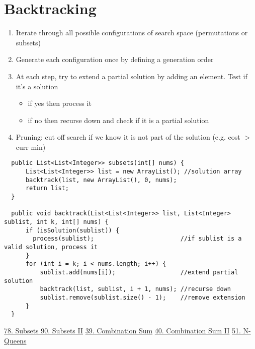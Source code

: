 \documentclass{article}
\begin{document}
  \section{Backtracking}
  \begin{enumerate}[noitemsep]
    \item Iterate through all possible configurations of search space (permutations or subsets)
    \item Generate each configuration once by defining a generation order
    \item At each step, try to extend a partial solution by adding an element. Test if it's a solution
      \begin{itemize}[noitemsep]
        \item if yes then process it
        \item if no then recurse down and check if it is a partial solution
      \end{itemize}
    \item Pruning: cut off search if we know it is not part of the solution (e.g. cost $>$ curr min)
  \end{enumerate}
  \begin{lstlisting}
  public List<List<Integer>> subsets(int[] nums) {
      List<List<Integer>> list = new ArrayList(); //solution array
      backtrack(list, new ArrayList(), 0, nums);
      return list;
  }
  
  public void backtrack(List<List<Integer>> list, List<Integer> sublist, int k, int[] nums) {
      if (isSolution(sublist)) {
        process(sublist);                        //if sublist is a valid solution, process it
      }
      for (int i = k; i < nums.length; i++) {
          sublist.add(nums[i]);                  //extend partial solution
          backtrack(list, sublist, i + 1, nums); //recurse down
          sublist.remove(sublist.size() - 1);    //remove extension
      }
  }
  \end{lstlisting}
  \href{https://leetcode.com/problems/subsets/description/}{78. Subsets
} \quad \href{https://leetcode.com/problems/subsets-ii/description/}{90. Subsets II} \quad \href{https://leetcode.com/problems/combination-sum/description/}{39. Combination Sum} \quad \href{https://leetcode.com/problems/combination-sum-ii/description/}{40. Combination Sum II} \quad \href{https://leetcode.com/problems/n-queens/description/}{51. N-Queens}
\end{document}
